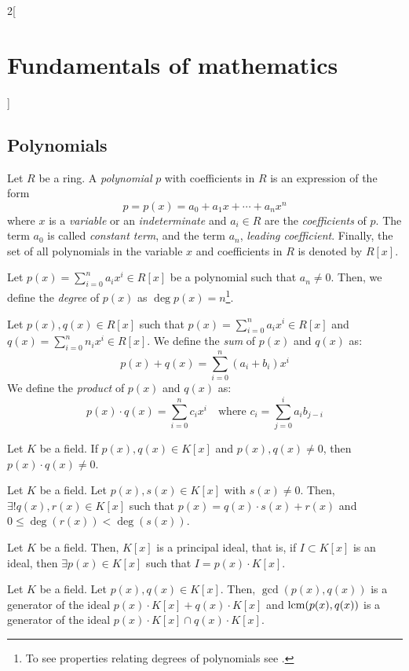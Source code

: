 \documentclass[../../../main_math.tex]{subfiles}
\begin{document}
\begin{multicols}{2}[\section{Fundamentals of mathematics}]
  \subsection{Polynomials}
  \begin{definition}
    Let $R$ be a ring. A \emph{polynomial} $p$ with coefficients in $R$ is an expression of the form $$p=p(x)=a_0+a_1x+\cdots+a_nx^n$$ where $x$ is a \emph{variable} or an \emph{indeterminate} and $a_i\in R$ are the \emph{coefficients} of $p$. The term $a_0$ is called \emph{constant term}, and the term $a_n$, \emph{leading coefficient}. Finally, the set of all polynomials in the variable $x$ and coefficients in $R$ is denoted by $R[x]$.
  \end{definition}
  \begin{definition}
    Let $p(x)=\sum_{i=0}^na_ix^i\in R[x]$ be a polynomial such that $a_n\ne 0$. Then, we define the \emph{degree} of $p(x)$ as $\deg p(x)=n$\footnote{To see properties relating degrees of polynomials see .}.
  \end{definition}
  \begin{definition}
    Let $p(x),q(x)\in R[x]$ such that $p(x)=\sum_{i=0}^na_ix^i\in R[x]$ and $q(x)=\sum_{i=0}^nn_ix^i\in R[x]$. We define the \emph{sum} of $p(x)$ and $q(x)$ as: $$p(x)+q(x)=\sum_{i=0}^n(a_i+b_i)x^i$$
    We define the \emph{product} of $p(x)$ and $q(x)$ as: $$p(x)\cdot q(x)=\sum_{i=0}^nc_ix^i\quad\text{where } c_i=\sum_{j=0}^ia_ib_{j-i}$$
  \end{definition}
  \begin{proposition}
    Let $K$ be a field. If $p(x),q(x)\in K[x]$ and $p(x),q(x)\ne 0$, then $p(x)\cdot q(x)\ne 0$.
  \end{proposition}
  \begin{theorem}
    Let $K$ be a field. Let $p(x),s(x)\in K[x]$ with $s(x)\ne 0$. Then, $\exists! q(x),r(x)\in K[x]$ such that $p(x)=q(x)\cdot s(x)+r(x)$ and $0\leq\deg(r(x))<\deg(s(x))$.
  \end{theorem}
  \begin{theorem}
    Let $K$ be a field. Then, $K[x]$ is a principal ideal, that is, if $I\subset K[x]$ is an ideal, then $\exists p(x)\in K[x]$ such that $I=p(x)\cdot K[x]$.
  \end{theorem}
  \begin{definition}
    Let $K$ be a field. Let $p(x),q(x)\in K[x]$. Then, $\gcd(p(x),q(x))$ is a generator of the ideal $p(x)\cdot K[x]+q(x)\cdot K[x]$ and $\operatorname{lcm}(p(x),q(x))$ is a generator of the ideal $p(x)\cdot K[x]\cap q(x)\cdot K[x]$.

\end{definition}
\end{multicols}
\end{document}

